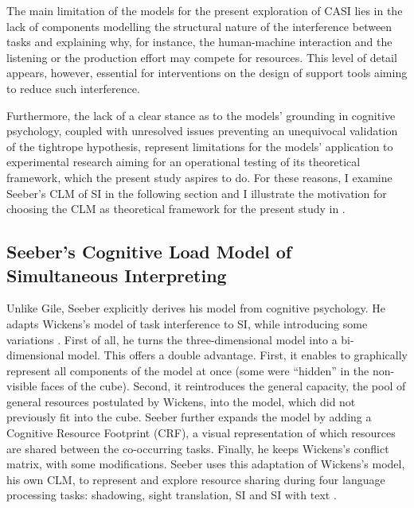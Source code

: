 The main limitation of the models for the present exploration of CASI lies in the lack of components modelling the structural nature of the interference between tasks and explaining why, for instance, the human-machine interaction and the listening or the production effort may compete for resources. This level of detail appears, however, essential for interventions on the design of support tools aiming to reduce such interference.

Furthermore, the lack of a clear stance as to the models' grounding in cognitive psychology, coupled with unresolved issues preventing an unequivocal validation of the tightrope hypothesis, represent limitations for the models' application to experimental research aiming for an operational testing of its theoretical framework, which the present study aspires to do. For these reasons, I examine Seeber's CLM of SI in the following section and I illustrate the motivation for choosing the CLM as theoretical framework for the present study in .


\subsection{Seeber's Cognitive Load Model of Simultaneous Interpreting} \label{seeber}
Unlike Gile, Seeber explicitly derives his model from cognitive psychology. He adapts Wickens's model of task interference to SI, while introducing some variations \citep{seeber_thinking_2007}. First of all, he turns the three-dimensional model into a bi-dimensional model. This offers a double advantage. First, it enables to graphically represent all components of the model at once (some were ``hidden'' in the non-visible faces of the cube). Second, it reintroduces the general capacity, the pool of general resources postulated by Wickens, into the model, which did not previously fit into the cube. Seeber further expands the model by adding a Cognitive Resource Footprint (CRF), a visual representation of which resources are shared between the co-occurring tasks. Finally, he keeps Wickens's conflict matrix, with some modifications. Seeber uses this adaptation of Wickens's model, his own CLM, to represent and explore resource sharing during four language processing tasks: shadowing, sight translation, SI \citep[1383]{seeber_thinking_2007} and SI with text \citep{seeber_multimodal_2017}.

